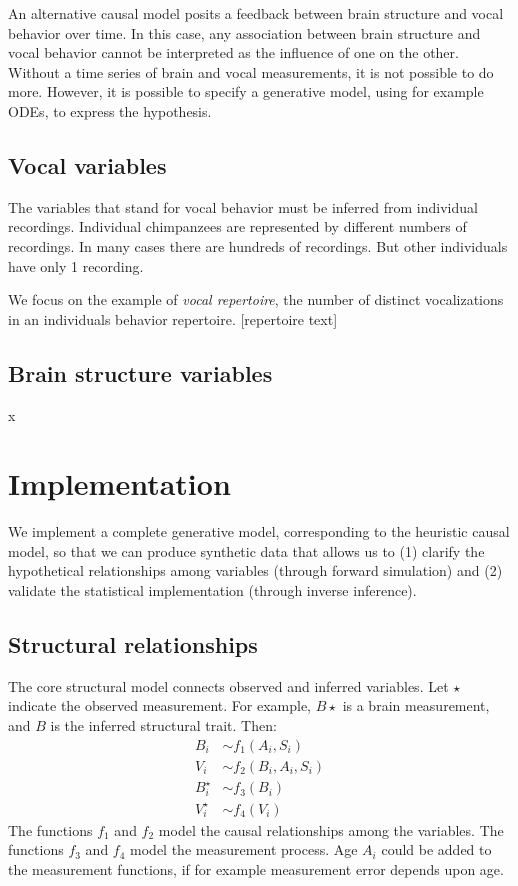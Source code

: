 \documentclass[reqno ,11pt]{amsart}
\begin{document}
An alternative causal model posits a feedback between brain structure and vocal behavior over time. In this case, any association between brain structure and vocal behavior cannot be interpreted as the influence of one on the other. Without a time series of brain and vocal measurements, it is not possible to do more. 
However, it is possible to specify a generative model, using for example ODEs, to express the hypothesis. 



\subsection{Vocal variables}

The variables that stand for vocal behavior must be inferred from individual recordings. Individual chimpanzees are represented by different numbers of recordings. In many cases there are hundreds of recordings. But other individuals have only 1 recording. 

We focus on the example of \emph{vocal repertoire}, the number of distinct vocalizations in an individuals behavior repertoire. 
[repertoire text]


\subsection{Brain structure variables}
x


\section{Implementation}

We implement a complete generative model, corresponding to the heuristic causal model, so that we can produce synthetic data that allows us to (1) clarify the hypothetical relationships among variables (through forward simulation) and (2) validate the statistical implementation (through inverse inference).

\subsection{Structural relationships}

The core structural model connects observed and inferred variables. Let $\star$ indicate the observed measurement. For example, $B\star$ is a brain measurement, and $B$ is the inferred structural trait. Then:
\begin{align*}
  B_i &\sim f_1 ( A_i , S_i )\\
  V_i &\sim f_2 ( B_i , A_i , S_i  )\\
  B_i^\star &\sim f_3 ( B_i )\\
  V_i^\star &\sim f_4 ( V_i )
\end{align*}
The functions $f_1$ and $f_2$ model the causal relationships among the variables. The functions $f_3$ and $f_4$ model the measurement process. Age $A_i$ could be added to the measurement functions, if for example measurement error depends upon age.
\end{document}
